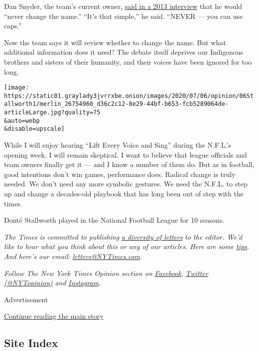 Dan Snyder, the team's current owner,
\href{https://www.usatoday.com/story/sports/nfl/redskins/2013/05/09/washington-redskins-daniel-snyder/2148127/}{said
in a 2013 interview} that he would ``never change the name.'' ``It's
that simple,'' he said. ``NEVER --- you can use caps.''

Now the team says it will review whether to change the name. But what
additional information does it need? The debate itself deprives our
Indigenous brothers and sisters of their humanity, and their voices have
been ignored for too long.

\texttt{[image: https://static01.graylady3jvrrxbe.onion/images/2020/07/06/opinion/06Stallworth1/merlin\_26754960\_d36c2c12-8e29-44bf-b653-fcb5289064de-articleLarge.jpg?quality=75\\\&auto=webp\\\&disable=upscale]}

While I will enjoy hearing ``Lift Every Voice and Sing'' during the
N.F.L.'s opening week, I will remain skeptical. I want to believe that
league officials and team owners finally get it --- and I know a number
of them do. But as in football, good intentions don't win games,
performance does. Radical change is truly needed. We don't need any more
symbolic gestures. We need the N.F.L. to step up and change a
decades-old playbook that has long been out of step with the times.

Donté Stallworth played in the National Football League for 10 seasons.

\emph{The Times is committed to publishing}
\href{https://www.nytimes3xbfgragh.onion/2019/01/31/opinion/letters/letters-to-editor-new-york-times-women.html}{\emph{a
diversity of letters}} \emph{to the editor. We'd like to hear what you
think about this or any of our articles. Here are some}
\href{https://help.nytimes3xbfgragh.onion/hc/en-us/articles/115014925288-How-to-submit-a-letter-to-the-editor}{\emph{tips}}\emph{.
And here's our email:}
\href{mailto:letters@NYTimes.com}{\emph{letters@NYTimes.com}}\emph{.}

\emph{Follow The New York Times Opinion section on}
\href{https://www.facebookcorewwwi.onion/nytopinion}{\emph{Facebook}}\emph{,}
\href{http://twitter.com/NYTOpinion}{\emph{Twitter (@NYTopinion)}}
\emph{and}
\href{https://www.instagram.com/nytopinion/}{\emph{Instagram}}\emph{.}

Advertisement

\protect\hyperlink{after-bottom}{Continue reading the main story}

\hypertarget{site-index}{%
\subsection{Site Index}\label{site-index}}

